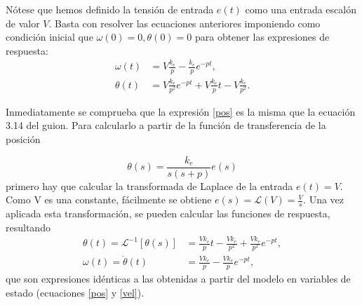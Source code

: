 \documentclass[a4paper, 12pt]{article}
\begin{document}
Nótese que hemos definido la tensión de entrada $e(t)$ como una entrada escalón de valor $V$. Basta con resolver las ecuaciones anteriores imponiendo como condición inicial que $\omega(0) = 0, \theta(0) = 0$ para obtener las expresiones de respuesta:
\begin{align}
	\omega(t) &= V\frac{k_e}{p} - \frac{k_e }{p} e^{-p t},  \label{vel}\\
	\theta(t) &= V\frac{k_e}{p^2}e^{-p t} + V\frac{k_e}{p} t - V\frac{k_e}{p^2}.  \label{pos}
\end{align}

Inmediatamente se comprueba que la expresión \ref{pos} es la misma que la ecuación 3.14 del guion. 
Para calcularlo a partir de la función de transferencia de la posición

\begin{equation}
	\theta(s) = \frac{k_e}{s(s + p)} e(s)
\end{equation}
primero hay que calcular la transformada de Laplace de la entrada $e(t) = V$. Como V es una constante, fácilmente se obtiene $e(s) = \mathcal{L} (V) = \frac{V}{s}$. Una vez aplicada esta transformación, se pueden calcular las funciones de respuesta, resultando
\begin{align}
	\theta(t) = \mathcal{L}^{-1} [\theta(s)] &=  \frac{V  k_e }{p} t - \frac{V k_e}{p^2} + \frac{V k_e}{p^2} e^{-p t}, \\
	\omega(t) = \dot\theta(t) &= \frac{V  k_e}{p} - \frac{V k_e}{p} e^{-p t},
\end{align}
que son expresiones idénticas a las obtenidas a partir del modelo en variables de estado (ecuaciones \ref{pos} y \ref{vel}).
\end{document}
